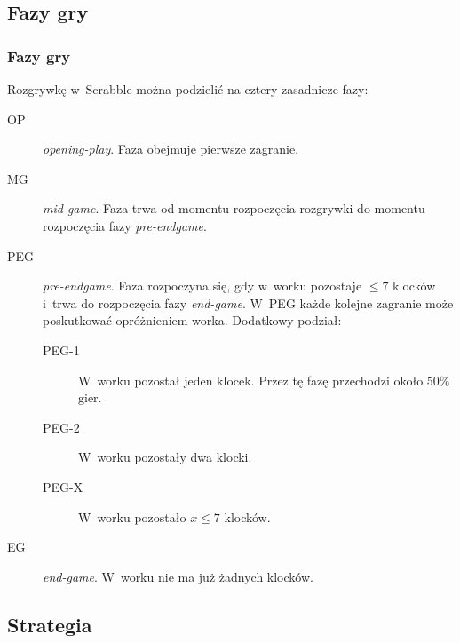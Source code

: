\documentclass[10pt,a4paper]{beamer}
\newcounter{task}
\newlength\taskwidth%
\newlength\taskvsep%
\def\taskpos{}
\def\taskanchor{}
\newcommand\task[1]{%
  {\parbox[t]{\taskwidth}{\scriptsize\Centering#1}}}
\newcommand\Task[2][]{%
\node[inner xsep=0pt] (c1) {\phantom{A}};
\stepcounter{task}
\ifodd\thetask\relax
  \renewcommand\taskpos{\taskvsep}\renewcommand\taskanchor{south}
\else
  \renewcommand\taskpos{-\taskvsep}\renewcommand\taskanchor{north}
\fi
\node[inner,font=\footnotesize\sffamily\color{textcolor}]    
  (c\the\numexpr\value{task}+1\relax) {#1};
\node[anchor=\taskanchor,yshift=\taskpos] 
  at (c\the\numexpr\value{task}+1\relax) {\task{#2}};
}
\newcommand\drawarrow{%
\ifnum\thetask=0\relax
  \node[on chain] (c1) {}; %
\fi
\node[on chain] (f) {};
\begin{pgfonlayer}{background}
\node[
  inner sep=10pt,
  single arrow,
  single arrow head extend=0.8cm,
  draw=none,
  fill=arrowcolor,
  fit= (c1) (f)
] (arrow) {};
\fill[white] %
  (arrow.before tail) -- (c1|-arrow.west) -- (arrow.after tail) -- cycle;
\end{pgfonlayer}
}
\newenvironment{timeline}[1][node distance=.75\taskwidth]
  {\par\noindent\begin{tikzpicture}[start chain,#1]}
  {\drawarrow\end{tikzpicture}\par}
\begin{document}
\subsection{Fazy gry}

\begin{frame}
	\frametitle{Fazy gry}
	
	Rozgrywkę w~Scrabble można podzielić na cztery zasadnicze fazy:

	\begin{description}
		\item[OP] \emph{opening-play}. Faza obejmuje pierwsze zagranie.
		\item[MG] \emph{mid-game}. Faza trwa od momentu rozpoczęcia rozgrywki do momentu rozpoczęcia fazy \emph{pre-endgame}.
		\item[PEG] \emph{pre-endgame}. Faza rozpoczyna się, gdy w~worku pozostaje $\leq 7$ klocków i~trwa do rozpoczęcia fazy \emph{end-game}. W~PEG każde kolejne zagranie może poskutkować opróżnieniem worka. Dodatkowy podział:
			\begin{description}
				\item[PEG-1] W~worku pozostał jeden klocek. Przez tę fazę przechodzi około $50\%$ gier.
				\item[PEG-2] W~worku pozostały dwa klocki.
				\item[PEG-X] W~worku pozostało $x \leq 7$ klocków.
			\end{description}
		\item[EG] \emph{end-game}. W~worku nie ma już żadnych klocków.
	\end{description}
\end{frame}

\captionsetup[figure]{skip=10pt}


\subsection{Strategia}
\end{document}
